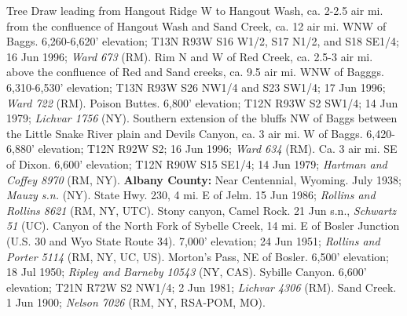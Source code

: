 Tree Draw leading from Hangout Ridge W to Hangout Wash, ca.
2-2.5 air mi. from the confluence of Hangout Wash and Sand Creek, ca. 12 air mi.
WNW of Baggs. 6,260-6,620’ elevation; T13N R93W S16 W1/2, S17 N1/2, and
S18 SE1/4; 16 Jun 1996; \textit{Ward 673} (RM).
Rim N and W of Red Creek, ca. 2.5-3 air mi. above the confluence
of Red and Sand creeks, ca. 9.5 air mi. WNW of Bagggs. 6,310-6,530’ elevation;
T13N R93W S26 NW1/4 and S23 SW1/4; 17 Jun 1996; \textit{Ward 722} (RM).
Poison Buttes. 6,800’ elevation; T12N R93W S2 SW1/4; 14 Jun 1979;
\textit{Lichvar 1756} (NY).
Southern extension of the bluffs NW of Baggs between the Little Snake River
plain and Devils Canyon, ca. 3 air mi. W of Baggs. 6,420-6,880’ elevation;
T12N R92W S2; 16 Jun 1996; \textit{Ward 634} (RM).
Ca. 3 air mi. SE of Dixon. 6,600’ elevation; T12N R90W S15 SE1/4; 14 Jun 1979;
\textit{Hartman and Coffey 8970} (RM, NY).
  \textbf{Albany County:}
Near Centennial, Wyoming. July 1938; \textit{Mauzy s.n.} (NY).
State Hwy. 230, 4 mi. E of Jelm. 15 Jun 1986;
\textit{Rollins and Rollins 8621} (RM, NY, UTC).
Stony canyon, Camel Rock. 21 Jun s.n., \textit{Schwartz 51} (UC).
Canyon of the North Fork of Sybelle Creek, 14 mi. E of Bosler Junction (U.S. 30
and Wyo State Route 34). 7,000’ elevation; 24 Jun 1951;
\textit{Rollins and Porter 5114} (RM, NY, UC, US).
Morton’s Pass, NE of Bosler. 6,500’ elevation; 18 Jul 1950;
\textit{Ripley and Barneby 10543} (NY, CAS).
Sybille Canyon. 6,600’ elevation; T21N R72W S2 NW1/4; 2 Jun 1981;
\textit{Lichvar 4306} (RM).
Sand Creek. 1 Jun 1900; \textit{Nelson 7026} (RM, NY, RSA-POM, MO).

